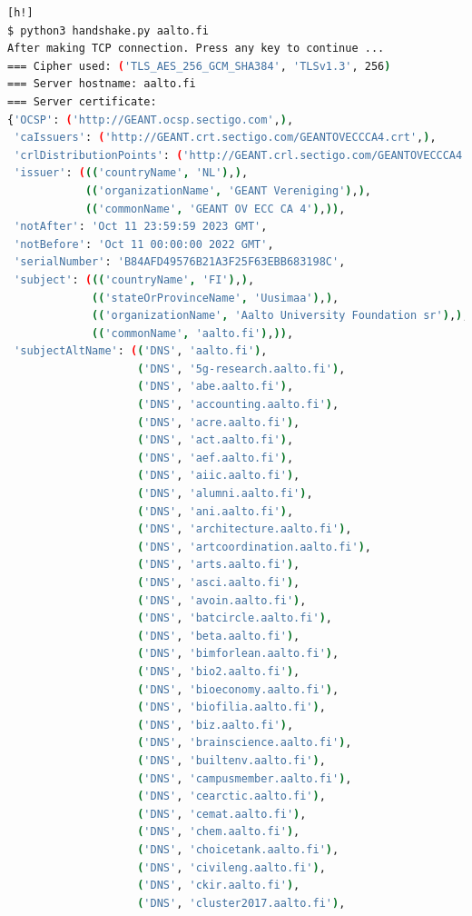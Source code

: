 \begin{lstlisting}[language=bash, caption= A TLS handshake connecting to
    \url{www.aalto.fi}., label={lst:handshake_aalto}][h!]
$ python3 handshake.py aalto.fi
After making TCP connection. Press any key to continue ...
=== Cipher used: ('TLS_AES_256_GCM_SHA384', 'TLSv1.3', 256)
=== Server hostname: aalto.fi
=== Server certificate:
{'OCSP': ('http://GEANT.ocsp.sectigo.com',),
 'caIssuers': ('http://GEANT.crt.sectigo.com/GEANTOVECCCA4.crt',),
 'crlDistributionPoints': ('http://GEANT.crl.sectigo.com/GEANTOVECCCA4.crl',),
 'issuer': ((('countryName', 'NL'),),
            (('organizationName', 'GEANT Vereniging'),),
            (('commonName', 'GEANT OV ECC CA 4'),)),
 'notAfter': 'Oct 11 23:59:59 2023 GMT',
 'notBefore': 'Oct 11 00:00:00 2022 GMT',
 'serialNumber': 'B84AFD49576B21A3F25F63EBB683198C',
 'subject': ((('countryName', 'FI'),),
             (('stateOrProvinceName', 'Uusimaa'),),
             (('organizationName', 'Aalto University Foundation sr'),),
             (('commonName', 'aalto.fi'),)),
 'subjectAltName': (('DNS', 'aalto.fi'),
                    ('DNS', '5g-research.aalto.fi'),
                    ('DNS', 'abe.aalto.fi'),
                    ('DNS', 'accounting.aalto.fi'),
                    ('DNS', 'acre.aalto.fi'),
                    ('DNS', 'act.aalto.fi'),
                    ('DNS', 'aef.aalto.fi'),
                    ('DNS', 'aiic.aalto.fi'),
                    ('DNS', 'alumni.aalto.fi'),
                    ('DNS', 'ani.aalto.fi'),
                    ('DNS', 'architecture.aalto.fi'),
                    ('DNS', 'artcoordination.aalto.fi'),
                    ('DNS', 'arts.aalto.fi'),
                    ('DNS', 'asci.aalto.fi'),
                    ('DNS', 'avoin.aalto.fi'),
                    ('DNS', 'batcircle.aalto.fi'),
                    ('DNS', 'beta.aalto.fi'),
                    ('DNS', 'bimforlean.aalto.fi'),
                    ('DNS', 'bio2.aalto.fi'),
                    ('DNS', 'bioeconomy.aalto.fi'),
                    ('DNS', 'biofilia.aalto.fi'),
                    ('DNS', 'biz.aalto.fi'),
                    ('DNS', 'brainscience.aalto.fi'),
                    ('DNS', 'builtenv.aalto.fi'),
                    ('DNS', 'campusmember.aalto.fi'),
                    ('DNS', 'cearctic.aalto.fi'),
                    ('DNS', 'cemat.aalto.fi'),
                    ('DNS', 'chem.aalto.fi'),
                    ('DNS', 'choicetank.aalto.fi'),
                    ('DNS', 'civileng.aalto.fi'),
                    ('DNS', 'ckir.aalto.fi'),
                    ('DNS', 'cluster2017.aalto.fi'),

\end{lstlisting}
